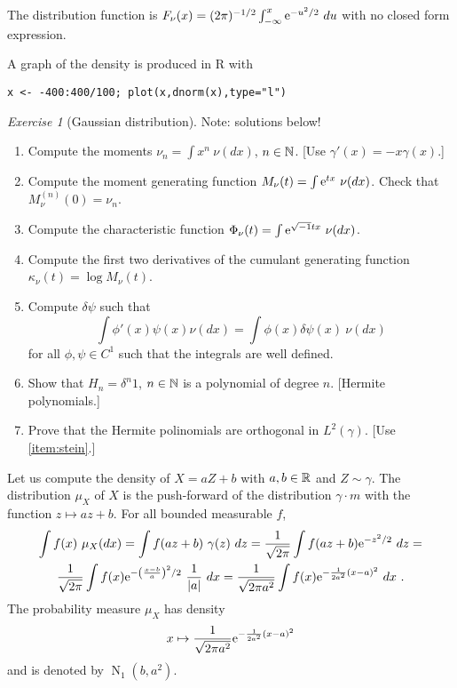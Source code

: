 \documentclass[12pt,a4paper]{amsart}
\newcommand{\gaussian}[3]{\operatorname{N}_{#1}\left(#2,#3\right)}
\theoremstyle{plain}%
\theoremstyle{definition}
\theoremstyle{remark}
\newtheorem{exercise}{Exercise}
\begin{document}
  The distribution function is
  $F_\nu(x) = (2\pi)^{-1/2} \int_{-\infty}^x \mathrm{e}^{-u^2/2} \ du$
  with no closed form expression.

  A graph of the density is
  produced in R with
\begin{verbatim}
x <- -400:400/100; plot(x,dnorm(x),type="l")
\end{verbatim}
%
\begin{exercise}[Gaussian distribution] Note: solutions below! 
\begin{enumerate}
\item Compute the moments $\nu_n = \int x^n \ \nu(dx)$, $n \in \mathbb{N}$. [Use $\gamma'(x) = -x \gamma(x)$.]
\item Compute the moment generating function $M_\nu(t) = \int \mathrm{e} ^{tx} \ \nu(dx)$. Check that $M^{(n)}_\nu(0) = \nu_n$.
\item Compute the characteristic function $\Phi_\nu(t) = \int \euler ^{\sqrt{-1} tx} \ \nu(dx)$.
\item Compute the first two derivatives of the cumulant generating function $\kappa_\nu(t) = \log M_\nu(t)$.
\item \label{item:stein} Compute $\delta \psi$ such that
  \begin{equation*}
    \int \phi'(x) \psi(x)  \nu(dx) = \int \phi(x) \delta \psi(x) \ \nu(dx)
  \end{equation*}
for all $\phi,\psi \in C^1$ such that the integrals are well defined.
\item Show that $H_n = \delta^n 1$, $n \in \mathbb{N}$ is a polynomial of degree $n$. [Hermite polynomials.]
\item Prove that the Hermite polinomials are orthogonal in $L^2(\gamma)$. [Use \cref{item:stein}.]
\end{enumerate}  
\end{exercise}

Let us compute the density of $X = aZ + b$ with $a,b \in \mathbb{R}$ and $Z \sim \gamma$. The distribution $\mu_X$ of $X$ is the push-forward of the distribution $\gamma \cdot m$ with the function $z \mapsto az + b$. For all bounded measurable $f$,
\begin{multline*}
  \int f(x) \ \mu_X(dx) = \int f(az+b) \ \gamma(z) \ dz = \frac1{\sqrt{2\pi}} \int f(az+b) \mathrm{e}^{-z^2/2} \ dz = 
\\ \frac1{\sqrt{2\pi}} \int f(x) \mathrm{e}^{-\left(\frac{x-b}{a}\right)^2/2} \ \frac1{\left\vert a\right\vert} \ dx = \frac1{\sqrt{2\pi a^2}} \int f(x) \mathrm{e}^{-\frac1{2a^2}(x-a)^2} \ dx\ .
\end{multline*}
The probability measure  $\mu_X$ has density
\begin{equation*}
  x \mapsto \frac1{\sqrt{2\pi a^2}} \mathrm{e}^{-\frac1{2a^2}(x-a)^2}
\end{equation*}
and is denoted by $\gaussian 1 b {a^2}$.
\end{document}
